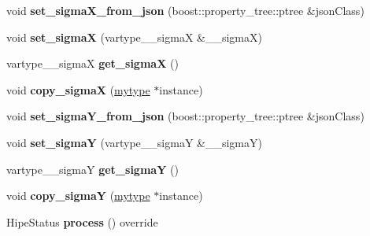 \begin{DoxyCompactItemize}
\mbox{\label{classfilter_1_1algos_1_1_blur_a11b9ae0b0735641b81a2601dcc255f34}} 
void {\bfseries set\+\_\+sigma\+X\+\_\+from\+\_\+json} (boost\+::property\+\_\+tree\+::ptree \&json\+Class)
\item 
\mbox{\label{classfilter_1_1algos_1_1_blur_a3583c601a8b6ce4d34edb7cc54c992d1}} 
void {\bfseries set\+\_\+sigmaX} (vartype\+\_\+\+\_\+sigmaX \&\+\_\+\+\_\+sigmaX)
\item 
\mbox{\label{classfilter_1_1algos_1_1_blur_a0d24fac2ff3cdbc635018f15a7e6d280}} 
vartype\+\_\+\+\_\+sigmaX {\bfseries get\+\_\+sigmaX} ()
\item 
\mbox{\label{classfilter_1_1algos_1_1_blur_a587a10389382fa90b6275b11a278066a}} 
void {\bfseries copy\+\_\+sigmaX} (\hyperlink{classfilter_1_1algos_1_1_blur}{mytype} $\ast$instance)
\item 
\mbox{\label{classfilter_1_1algos_1_1_blur_a178c7055d2d2e5a8c4a73a96df6c3030}} 
void {\bfseries set\+\_\+sigma\+Y\+\_\+from\+\_\+json} (boost\+::property\+\_\+tree\+::ptree \&json\+Class)
\item 
\mbox{\label{classfilter_1_1algos_1_1_blur_a7aec769d428a23c48eb24da0c9b56d44}} 
void {\bfseries set\+\_\+sigmaY} (vartype\+\_\+\+\_\+sigmaY \&\+\_\+\+\_\+sigmaY)
\item 
\mbox{\label{classfilter_1_1algos_1_1_blur_a6b32b9ba3d3190a0bc1ffc9d1109924b}} 
vartype\+\_\+\+\_\+sigmaY {\bfseries get\+\_\+sigmaY} ()
\item 
\mbox{\label{classfilter_1_1algos_1_1_blur_aba890034e4207b9a930f0d425ff026a5}} 
void {\bfseries copy\+\_\+sigmaY} (\hyperlink{classfilter_1_1algos_1_1_blur}{mytype} $\ast$instance)
\item 
\mbox{\label{classfilter_1_1algos_1_1_blur_a3178b579095efc92d0b0e800e12e4a29}} 
Hipe\+Status {\bfseries process} () override
\end{DoxyCompactItemize}
